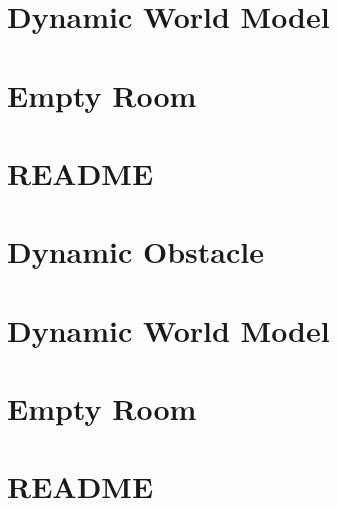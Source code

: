 \let\mypdfximage\pdfximage\def\pdfximage{\immediate\mypdfximage}\documentclass[twoside]{book}
\newcommand{\+}{\discretionary{\mbox{\scriptsize$\hookleftarrow$}}{}{}}
\begin{document}
\chapter{Dynamic World Model}
\label{md_smacc2_sm_reference_library_sm_dance_bot_models_dynamic_world_README}

\chapter{Empty Room}
\label{md_smacc2_sm_reference_library_sm_dance_bot_models_empty_room_README}

\chapter{README}
\label{md_smacc2_sm_reference_library_sm_dance_bot_README}

\chapter{Dynamic Obstacle}
\label{md_smacc2_sm_reference_library_sm_dance_bot_lite_models_dynamic_obstacle_README}

\chapter{Dynamic World Model}
\label{md_smacc2_sm_reference_library_sm_dance_bot_lite_models_dynamic_world_README}

\chapter{Empty Room}
\label{md_smacc2_sm_reference_library_sm_dance_bot_lite_models_empty_room_README}

\chapter{README}
\label{md_smacc2_sm_reference_library_sm_dance_bot_lite_README}

\end{document}
